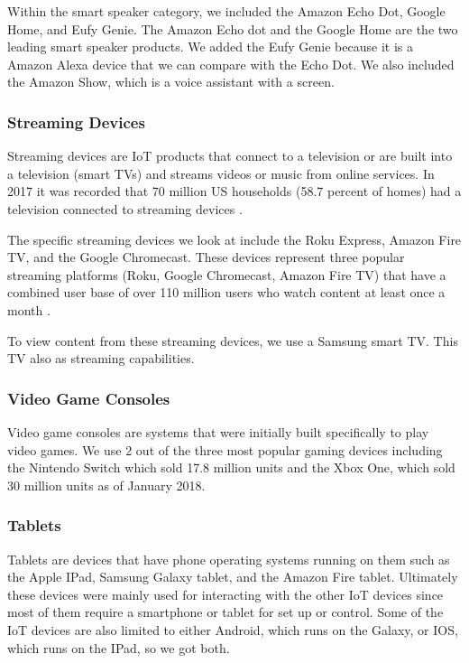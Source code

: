 Within the smart speaker category, we included the Amazon Echo Dot, Google Home, and Eufy Genie. The Amazon Echo dot and the Google Home are the two leading smart speaker products. We added the Eufy Genie because it is a Amazon Alexa device that we can compare with the Echo Dot. We also included the Amazon Show, which is a voice assistant with a screen.

\subsubsection{Streaming Devices}

Streaming devices are IoT products that connect to a television or are built into a television (smart TVs) and streams videos or music from online services. In 2017 it was recorded that 70 million US households (58.7 percent of homes) had a television connected to streaming devices \cite{lynch_2017}.

The specific streaming devices we look at include the Roku Express, Amazon Fire TV, and the Google Chromecast. These devices represent three popular streaming platforms (Roku, Google Chromecast, Amazon Fire TV) that have a combined user base of over 110 million users who watch content at least once a month \cite{emarketer_2017}.

To view content from these streaming devices, we use a Samsung smart TV. This TV also as streaming capabilities.

\subsubsection{Video Game Consoles}

Video game consoles are systems that were initially built specifically to play video games. We use 2 out of the three most popular gaming devices including the Nintendo Switch which sold 17.8 million units \cite{nintendo} and the Xbox One, which sold 30 million units \cite{souppouris_2016} as of January 2018.

\subsubsection{Tablets}

Tablets are devices that have phone operating systems running on them such as the Apple IPad, Samsung Galaxy tablet, and the Amazon Fire tablet. Ultimately these devices were mainly used for interacting with the other IoT devices since most of them require a smartphone or tablet for set up or control. Some of the IoT devices are also limited to either Android, which runs on the Galaxy, or IOS, which runs on the IPad, so we got both.

